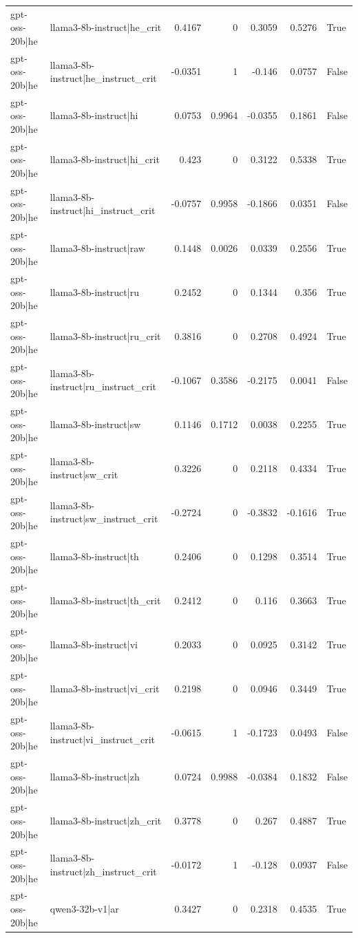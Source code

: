 \begin{table}
\begin{tabular}{l l r r r r l}
gpt-oss-20b|he & llama3-8b-instruct|he_crit & 0.4167 & 0 & 0.3059 & 0.5276 & True \\
gpt-oss-20b|he & llama3-8b-instruct|he_instruct_crit & -0.0351 & 1 & -0.146 & 0.0757 & False \\
gpt-oss-20b|he & llama3-8b-instruct|hi & 0.0753 & 0.9964 & -0.0355 & 0.1861 & False \\
gpt-oss-20b|he & llama3-8b-instruct|hi_crit & 0.423 & 0 & 0.3122 & 0.5338 & True \\
gpt-oss-20b|he & llama3-8b-instruct|hi_instruct_crit & -0.0757 & 0.9958 & -0.1866 & 0.0351 & False \\
gpt-oss-20b|he & llama3-8b-instruct|raw & 0.1448 & 0.0026 & 0.0339 & 0.2556 & True \\
gpt-oss-20b|he & llama3-8b-instruct|ru & 0.2452 & 0 & 0.1344 & 0.356 & True \\
gpt-oss-20b|he & llama3-8b-instruct|ru_crit & 0.3816 & 0 & 0.2708 & 0.4924 & True \\
gpt-oss-20b|he & llama3-8b-instruct|ru_instruct_crit & -0.1067 & 0.3586 & -0.2175 & 0.0041 & False \\
gpt-oss-20b|he & llama3-8b-instruct|sw & 0.1146 & 0.1712 & 0.0038 & 0.2255 & True \\
gpt-oss-20b|he & llama3-8b-instruct|sw_crit & 0.3226 & 0 & 0.2118 & 0.4334 & True \\
gpt-oss-20b|he & llama3-8b-instruct|sw_instruct_crit & -0.2724 & 0 & -0.3832 & -0.1616 & True \\
gpt-oss-20b|he & llama3-8b-instruct|th & 0.2406 & 0 & 0.1298 & 0.3514 & True \\
gpt-oss-20b|he & llama3-8b-instruct|th_crit & 0.2412 & 0 & 0.116 & 0.3663 & True \\
gpt-oss-20b|he & llama3-8b-instruct|vi & 0.2033 & 0 & 0.0925 & 0.3142 & True \\
gpt-oss-20b|he & llama3-8b-instruct|vi_crit & 0.2198 & 0 & 0.0946 & 0.3449 & True \\
gpt-oss-20b|he & llama3-8b-instruct|vi_instruct_crit & -0.0615 & 1 & -0.1723 & 0.0493 & False \\
gpt-oss-20b|he & llama3-8b-instruct|zh & 0.0724 & 0.9988 & -0.0384 & 0.1832 & False \\
gpt-oss-20b|he & llama3-8b-instruct|zh_crit & 0.3778 & 0 & 0.267 & 0.4887 & True \\
gpt-oss-20b|he & llama3-8b-instruct|zh_instruct_crit & -0.0172 & 1 & -0.128 & 0.0937 & False \\
gpt-oss-20b|he & qwen3-32b-v1|ar & 0.3427 & 0 & 0.2318 & 0.4535 & True \\

\end{tabular}
\end{table}
